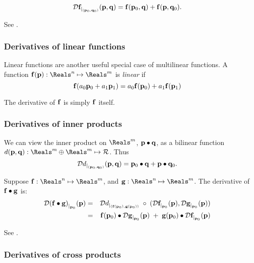 \begin{equation}
{\mathcal{D}{{\mathbf f}}_{\mid_{({\mathbf p}_0,{\mathbf q}_0)}}({{\mathbf p},{\mathbf q}})} = {\mathbf f}({\mathbf p}_0,{\mathbf q}) + {\mathbf f}({\mathbf p},{\mathbf q}_0).
\end{equation}

See \cite[ex.~2-12]{spivak-1965}.


\subsubsection{Derivatives of linear functions}
\label{sec:Derivatives-of-linear-functions}

Linear functions are another useful special case of multilinear functions.
A function $\f(\p):\Reals^{n} \mapsto \Reals^m$
is {\it linear} if
\begin{equation}
{\mathbf f}(a_0 {\mathbf p}_0 + a_1 {\mathbf p}_1)
 =
a_0 {\mathbf f}({\mathbf p}_0) + a_1 {\mathbf f}({\mathbf p}_1)
\end{equation}

The derivative of ${\mathbf f}$ is simply ${\mathbf f}$ itself.


\subsubsection{Derivatives of inner products}
\label{sec:inner}

We can view the inner product on $\Reals^m$, ${\mathbf p} \bullet {\mathbf q}$,
as a bilinear function $d(\p,\q) : \Reals^m \oplus \Reals^m \mapsto \Re$.
Thus
\begin{equation}
{\mathcal{D}{d}_{\mid_{({\mathbf p}_0,{\mathbf q}_0)}}({{\mathbf p},{\mathbf q}})} = {\mathbf p}_0 \bullet {\mathbf q} + {\mathbf p} \bullet {\mathbf q}_0.
\end{equation}

Suppose
$\f:\Reals^{n} \mapsto \Reals^{m}$, and
$\g:\Reals^{n} \mapsto \Reals^{m}$.
The derivative of ${\mathbf f} \bullet {\mathbf g}$ is:
\begin{eqnarray}
\label{eq:dot_derivative}
\Dc{(\f \bullet \g)}{\p_0}{\p}
& =
& \Db{d}{(\f(\p_0),\g(\p_0))} \;\circ \;(\Dc{\f}{\p_0}{\p}, \Dc{\g}{\p_0}{\p})
\\
& =
& \f(\p_0) \bullet \Dc{\g}{\p_0}{\p} \; + \; \g(\p_0) \bullet \Dc{\f}{\p_0}{\p} \nonumber
\end{eqnarray}

See \cite[ex.~2-13]{spivak-1965}.



\subsubsection{Derivatives of cross products}
\label{sec:cross}

